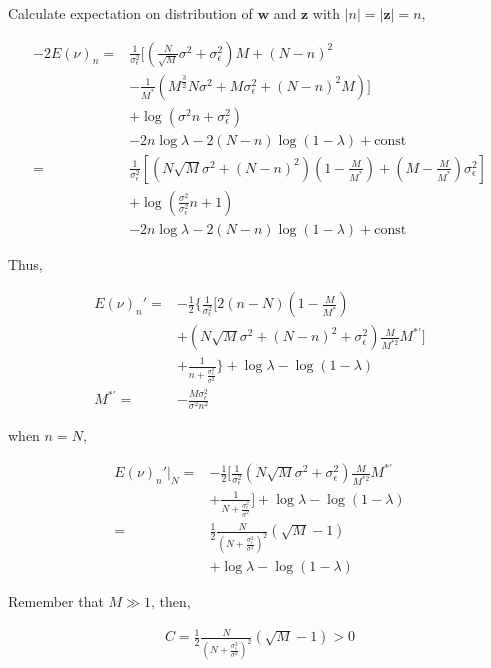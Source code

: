 \documentclass[notitlepage]{article}
\begin{document}
Calculate expectation on distribution of $\bm{w}$ and $\bm{z}$ with $|n|=|\bm{z}|=n$, 

\begin{align}
    -2E(\nu)_n =& \frac{1}{\sigma_\epsilon^2}[(\frac{N}{\sqrt{M}}\sigma^2+\sigma_\epsilon^2)M+(N-n)^2 \\
    &-\frac{1}{M^\ast}(M^{\frac{3}{2}}N\sigma^2+M\sigma_\epsilon^2+(N-n)^2 M)] \\
    &+ \log(\sigma^2n+\sigma_\epsilon^2) \\
    &- 2n\log\lambda - 2(N-n)\log(1-\lambda) + \mathrm{const} \\
    =& \frac{1}{\sigma_\epsilon^2}[(N\sqrt{M}\sigma^2+(N-n)^2)(1-\frac{M}{M^\ast})+(M-\frac{M}{M^\ast})\sigma_\epsilon^2] \\
    &+ \log(\frac{\sigma^2}{\sigma_\epsilon^2}n+1) \\
    &- 2n\log\lambda - 2(N-n)\log(1-\lambda) + \mathrm{const}
\end{align}

Thus, 

\begin{align}
    E(\nu)_n' =& -\frac{1}{2}\{\frac{1}{\sigma_\epsilon^2}[2(n-N)(1-\frac{M}{M^\ast}) \\
    &+(N\sqrt{M}\sigma^2+(N-n)^2+\sigma_\epsilon^2)\frac{M}{M^{\ast2}}M^{\ast'}] \\
    &+\frac{1}{n+\frac{\sigma_\epsilon^2}{\sigma^2}}\} + \log\lambda - \log(1-\lambda) \\
    M^{\ast'} =& -\frac{M\sigma_\epsilon^2}{\sigma^2n^2}
\end{align}

when $n=N$,

\begin{align}
    E(\nu)_n'|_N =& -\frac{1}{2}[\frac{1}{\sigma_\epsilon^2}(N\sqrt{M}\sigma^2+\sigma_\epsilon^2)\frac{M}{M^{\ast2}}M^{\ast'} \\
    &+\frac{1}{N+\frac{\sigma_\epsilon^2}{\sigma^2}}] + \log\lambda - \log(1-\lambda) \\
    =& \frac{1}{2}\frac{N}{(N+\frac{\sigma_\epsilon^2}{\sigma^2})^2}(\sqrt{M}-1) \\
    &+ \log\lambda - \log(1-\lambda)
\end{align}

Remember that $M \gg 1$, then,

\begin{align}
    C = \frac{1}{2}\frac{N}{(N+\frac{\sigma_\epsilon^2}{\sigma^2})^2}(\sqrt{M}-1) > 0
\end{align}
\end{document}
